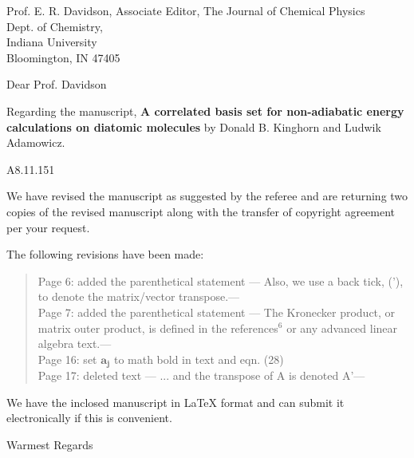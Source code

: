 \documentclass{letter}
\begin{document}
\begin{letter}{Prof. E. R. Davidson, Associate Editor, The Journal of Chemical Physics\\
               Dept. of Chemistry,\\
               Indiana University\\
               Bloomington, IN 47405}      

\opening{Dear Prof. Davidson}
Regarding the manuscript, \textbf{A correlated basis set for
non-adiabatic energy calculations on diatomic molecules }
by Donald B. Kinghorn and Ludwik Adamowicz. 

A8.11.151

We have revised the manuscript as suggested by the referee and are returning
two copies of the revised manuscript along with the transfer of copyright
agreement per your request.

The following revisions have been made:
\begin{quote}
  Page 6: added the parenthetical statement --- 
  Also, we use a back tick, ('), to denote the matrix/vector transpose.---\\
  Page 7: added the parenthetical statement --- The Kronecker product, or 
  matrix outer product, is defined in the references$^{6}$ or any
  advanced linear algebra text.---\\
  Page 16: set $\mathbf{a_{j}}$ to math bold in text and eqn. (28)\\
  Page 17: deleted text --- ... and the transpose of A is denoted A'---
\end{quote}

We have the inclosed manuscript in LaTeX format and can submit it electronically if this is convenient.


\closing{Warmest Regards}

\end{letter}
\end{document}

